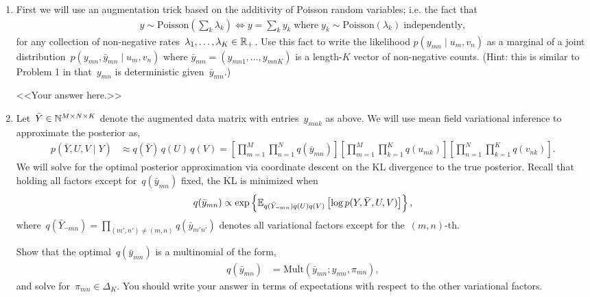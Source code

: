 \documentclass[11pt]{article}
\begin{document}
\begin{enumerate}[label=(\alph*)]
    \item First we will use an augmentation trick based on the additivity of Poisson random variables; i.e. the fact that
    \begin{align*}
        y \sim \mathrm{Poisson}\left(\sum_k \lambda_k \right) \iff y = \sum_k y_k \; \text{where} \; y_k \sim \mathrm{Poisson}(\lambda_k) \; \text{independently},
    \end{align*}
    for any collection of non-negative rates~$\lambda_1, \ldots, \lambda_K \in \mathbb{R}_+$.  Use this fact to write the likelihood $p(y_{mn} \mid u_m, v_n)$ as a marginal of a joint distribution~$p(y_{mn}, \bar{y}_{mn} \mid u_m, v_n)$ where $\bar{y}_{mn} = (y_{mn1}, \ldots, y_{mnK})$ is a length-$K$ vector of non-negative counts.  (Hint: this is similar to Problem 1 in that~$y_{mn}$ is deterministic given~$\bar{y}_{mn}$.)
    
    \begin{solution}
    <<Your answer here.>>
    \end{solution}
    
    \item Let~$\bar{Y} \in \mathbb{N}^{M \times N \times K}$ denote the augmented data matrix with entries~$y_{mnk}$ as above.  We will use mean field variational inference to approximate the posterior as,
    \begin{align*}
        p(\bar{Y}, U, V \mid Y) &\approx q(\bar{Y}) \, q(U) \, q(V) = \left[\prod_{m=1}^M \prod_{n=1}^N q(\bar{y}_{mn}) \right] 
        \left[ \prod_{m=1}^M \prod_{k=1}^K q(u_{mk}) \right] \left[ \prod_{n=1}^N \prod_{k=1}^K q(v_{nk}) \right].
    \end{align*}
    We will solve for the optimal posterior approximation via coordinate descent on the KL divergence to the true posterior.  Recall that holding all factors except for~$q(\bar{y}_{mn})$ fixed, the KL is minimized when
    \begin{align*}
        q(\bar{y}_{mn}) \propto \exp \left\{\mathbb{E}_{q(\bar{Y}_{\neg mn}) q(U) q(V)} \left[ \log p(Y, \bar{Y}, U, V) \right] \right\},
    \end{align*}
    where~$q(\bar{Y}_{\neg mn}) = \prod_{(m',n') \neq (m,n)} q(\bar{y}_{m'n'})$ denotes all variational factors except for the~$(m,n)$-th.
    
    Show that the optimal~$q(\bar{y}_{mn})$ is a multinomial of the form,
    \begin{align*}
        q(\bar{y}_{mn}) &= \mathrm{Mult}(\bar{y}_{mn} ; y_{mn}, \pi_{mn}),
    \end{align*}
    and solve for~$\pi_{mn} \in \Delta_K$.  You should write your answer in terms of expectations with respect to the other variational factors.
    

\end{enumerate}
\end{document}
